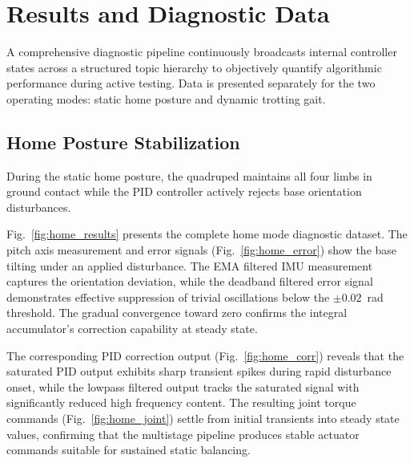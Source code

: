 \section{Results and Diagnostic Data}

A comprehensive diagnostic pipeline continuously broadcasts
internal controller states across a structured topic hierarchy
to objectively quantify algorithmic performance during active
testing. Data is presented separately for the two operating
modes: static home posture and dynamic trotting gait.

\subsection{Home Posture Stabilization}

During the static home posture, the quadruped maintains all four
limbs in ground contact while the PID controller actively
rejects base orientation disturbances.

Fig.~\ref{fig:home_results} presents the complete home mode
diagnostic dataset. The pitch axis measurement and error signals
(Fig.~\ref{fig:home_error}) show the base tilting under an
applied disturbance. The EMA filtered IMU measurement captures
the orientation deviation, while the deadband filtered error
signal demonstrates effective suppression of trivial oscillations
below the $\pm 0.02$~rad threshold. The gradual convergence
toward zero confirms the integral accumulator's correction
capability at steady state.

The corresponding PID correction output
(Fig.~\ref{fig:home_corr}) reveals that the saturated PID output
exhibits sharp transient spikes during rapid disturbance onset,
while the lowpass filtered output tracks the saturated signal
with significantly reduced high frequency content. The resulting
joint torque commands (Fig.~\ref{fig:home_joint}) settle from
initial transients into steady state values, confirming that the
multistage pipeline produces stable actuator commands suitable
for sustained static balancing.

